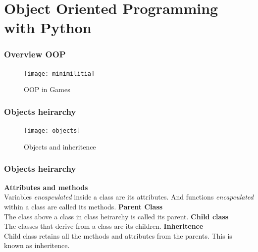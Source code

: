 \documentclass[12pt, aspectratio=169]{beamer}
\begin{document}
\section{Object Oriented Programming with Python}
\vspace{2em}
 \begin{frame}[fragile]
   \frametitle{Overview OOP}
   \begin{figure}
     \centering
   \texttt{[image: minimilitia]}  
     \caption{OOP in Games}
   \end{figure}
 \end{frame}


 \begin{frame}[fragile]
   \frametitle{Objects heirarchy}
  \begin{figure}
     \centering
     \texttt{[image: objects]}  
     \caption{Objects and inheritence}
   \end{figure}

 \end{frame}


 \begin{frame}[fragile]
   \frametitle{Objects heirarchy}
  \textbf{Attributes and methods} \\ 
  Variables \textit{encapculated} inside a class are its attributes. And functions
  \textit{encapculated} within a class are called its methods.
  \linebreak
  \linebreak
  \textbf{Parent Class} \\ 
  The class above a class in class heirarchy is called its parent.
  \linebreak
  \linebreak
  \textbf{Child class} \\ 
  The classes that derive from a class are its children.
  \linebreak
  \linebreak
  \textbf{Inheritence} \\
\small{  Child class retains all the methods and attributes from the parents. This is}
  known as inheritence.
 \end{frame}
\end{document}
